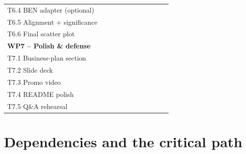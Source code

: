 \documentclass[11pt, a4paper, oneside, openany]{report}
\begin{document}
\begin{table}[H]
\begin{tabular}{|p{4.0cm}|c|c|c|c|c|c|c|c|c|c|}
T6.4 BEN adapter (optional)     &                    &                    &                    &                    &                    &                    & \cellcolor{wplight}&                    &                    &                    \\
T6.5 Alignment + significance   &                    &                    &                    &                    &                    &                    &                    & \cellcolor{wpcrit} &                    &                    \\
T6.6 Final scatter plot         &                    &                    &                    &                    &                    &                    &                    & \cellcolor{wpcrit} &                    &                    \\
\hline
\multicolumn{11}{|l|}{\textbf{WP7 -- Polish \& defense}} \\
\hline
T7.1 Business-plan section      &                    &                    &                    &                    &                    &                    &                    &                    & \cellcolor{wplight}&                    \\
T7.2 Slide deck                 &                    &                    &                    &                    &                    &                    &                    &                    & \cellcolor{wpcrit} & \cellcolor{wpcrit} \\
T7.3 Promo video                &                    &                    &                    &                    &                    &                    &                    &                    & \cellcolor{wplight}&                    \\
T7.4 README polish              &                    &                    &                    &                    &                    &                    &                    &                    & \cellcolor{wplight}&                    \\
T7.5 Q\&A rehearsal             &                    &                    &                    &                    &                    &                    &                    &                    &                    & \cellcolor{wpcrit} \\
\hline
\end{tabular}
\end{table}

\section{Dependencies and the critical path}
\end{document}
